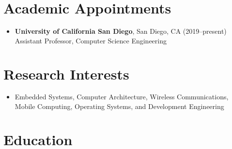 \documentclass{article}
\begin{document}
%
%
%


\section*{Academic Appointments}

\begin{itemize}
  \item[]
    \textbf{University of California San Diego}, San Diego, CA (2019--present) \\
    Assistant Professor, Computer Science Engineering
\end{itemize}

\section*{Research Interests}
\begin{itemize}
  \item[] Embedded Systems, Computer Architecture, Wireless Communications, Mobile Computing, Operating Systems, and Development Engineering
\end{itemize}

\section*{Education}
\end{document}
